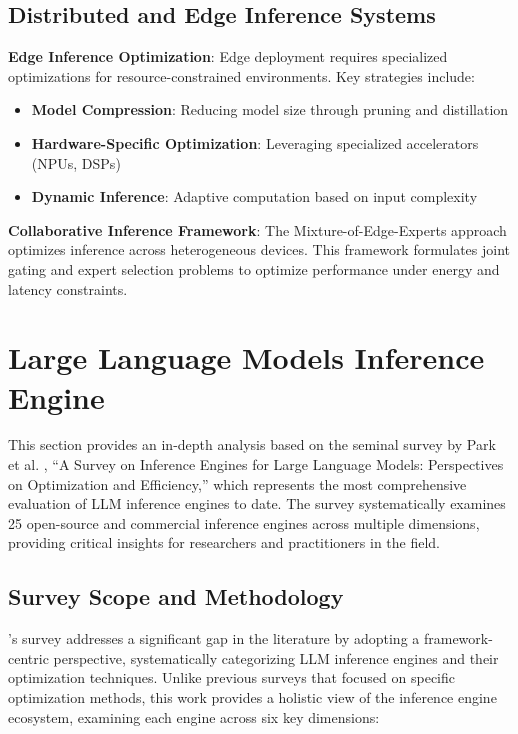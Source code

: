 \documentclass[12pt,a4paper]{article}
\begin{document}
\subsection{Distributed and Edge Inference Systems}
\textbf{Edge Inference Optimization}: Edge deployment requires specialized optimizations for resource-constrained environments. Key strategies include:

\begin{itemize}
    \item \textbf{Model Compression}: Reducing model size through pruning and distillation
    \item \textbf{Hardware-Specific Optimization}: Leveraging specialized accelerators (NPUs, DSPs)
    \item \textbf{Dynamic Inference}: Adaptive computation based on input complexity
\end{itemize}

\textbf{Collaborative Inference Framework}: The Mixture-of-Edge-Experts approach optimizes inference across heterogeneous devices. This framework formulates joint gating and expert selection problems to optimize performance under energy and latency constraints.

\section{Large Language Models Inference Engine }

This section provides an in-depth analysis based on the seminal survey by Park et al. \cite{park2025}, ``A Survey on Inference Engines for Large Language Models: Perspectives on Optimization and Efficiency,'' which represents the most comprehensive evaluation of LLM inference engines to date. The survey systematically examines 25 open-source and commercial inference engines across multiple dimensions, providing critical insights for researchers and practitioners in the field.

\subsection{Survey Scope and Methodology}

\cite{park2025}'s survey addresses a significant gap in the literature by adopting a framework-centric perspective, systematically categorizing LLM inference engines and their optimization techniques. Unlike previous surveys that focused on specific optimization methods, this work provides a holistic view of the inference engine ecosystem, examining each engine across six key dimensions:
\end{document}
